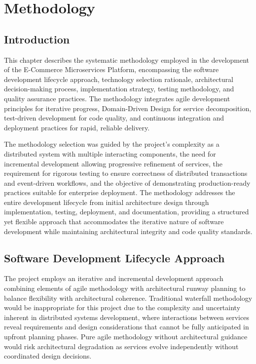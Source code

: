 \chapter{Methodology}

\section{Introduction}

This chapter describes the systematic methodology employed in the development of the E-Commerce Microservices Platform, encompassing the software development lifecycle approach, technology selection rationale, architectural decision-making process, implementation strategy, testing methodology, and quality assurance practices. The methodology integrates agile development principles for iterative progress, Domain-Driven Design for service decomposition, test-driven development for code quality, and continuous integration and deployment practices for rapid, reliable delivery.

The methodology selection was guided by the project's complexity as a distributed system with multiple interacting components, the need for incremental development allowing progressive refinement of services, the requirement for rigorous testing to ensure correctness of distributed transactions and event-driven workflows, and the objective of demonstrating production-ready practices suitable for enterprise deployment. The methodology addresses the entire development lifecycle from initial architecture design through implementation, testing, deployment, and documentation, providing a structured yet flexible approach that accommodates the iterative nature of software development while maintaining architectural integrity and code quality standards.

\section{Software Development Lifecycle Approach}

The project employs an iterative and incremental development approach combining elements of agile methodology with architectural runway planning to balance flexibility with architectural coherence. Traditional waterfall methodology would be inappropriate for this project due to the complexity and uncertainty inherent in distributed systems development, where interactions between services reveal requirements and design considerations that cannot be fully anticipated in upfront planning phases. Pure agile methodology without architectural guidance would risk architectural degradation as services evolve independently without coordinated design decisions.

